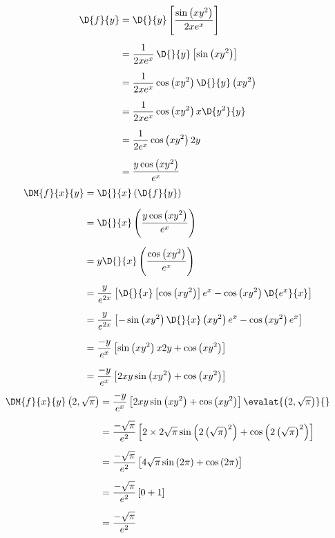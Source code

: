 \documentclass[a4paper,12pt,fleqn]{article}
\begin{document}
\begin{answer}
  \begin{align*}
    \D{f}{y}
    & = \D{}{y} \left[\frac{\sin\left(xy^2\right)}{2xe^x}\right]       \\[2mm]
    & = \frac{1}{2xe^x} \, \D{}{y} \left[\sin\left(xy^2\right)\right]  \\[2mm]
    & = \frac{1}{2xe^x} \cos\left(xy^2\right) \D{}{y}\left(xy^2\right) \\[2mm]
    & = \frac{1}{2xe^x} \cos\left(xy^2\right) x \D{y^2}{y}             \\[2mm]
    & = \frac{1}{2e^x} \cos\left(xy^2\right) 2y                        \\[2mm]
    & = \frac{y\cos\left(xy^2\right)}{e^x}
  \end{align*}
  \begin{align*}
    \DM{f}{x}{y}
    & = \D{}{x}\left(\D{f}{y}\right)                                  \\[2mm]
    & = \D{}{x}\left(\frac{y\cos\left(xy^2\right)}{e^x}\right)        \\[2mm]
    & = y \D{}{x}\left(\frac{\cos\left(xy^2\right)}{e^x}\right)       \\[2mm]
    & = \frac{y}{e^{2x}}\left[
    \D{}{x}\left[\cos\left(xy^2\right)\right]e^x  -
    \cos\left(xy^2\right)\D{e^x}{x}
    \right]                                                       \\[2mm]
    & = \frac{y}{e^{2x}}\left[
    -\sin\left(xy^2\right)\D{}{x}\left(xy^2\right)e^x  -
    \cos\left(xy^2\right)e^x
    \right]                                                       \\[2mm]
    & = \frac{-y}{e^{x}}\left[
    \sin\left(xy^2\right)x2y + \cos\left(xy^2\right)
    \right]                                                       \\[2mm]
    & = \frac{-y}{e^{x}}\left[
    2xy\sin\left(xy^2\right) + \cos\left(xy^2\right)
    \right]
  \end{align*}
  \begin{align*}
    \DM{f}{x}{y}\left(2, \sqrt{\pi}\right)
    & = \frac{-y}{e^{x}}\left[
        2xy\sin\left(xy^2\right) + \cos\left(xy^2\right)
    \right] \evalat{\left(2, \sqrt{\pi}\right)}{} \\[2mm]
    & = \frac{-\sqrt{\pi}}{e^2}\left[
          2\times 2\sqrt{\pi}\sin\left(2\left(\sqrt{\pi}\right)^2\right)
          + \cos\left(2\left(\sqrt{\pi}\right)^2\right)
        \right]  \\[2mm]
    & = \frac{-\sqrt{\pi}}{e^2}\left[
          4\sqrt{\pi}\sin\left(2\pi\right)
          + \cos\left(2\pi\right)
        \right]   \\[2mm]
    & = \frac{-\sqrt{\pi}}{e^2}\left[ 0 + 1 \right]    \\[2mm]
    & = \frac{-\sqrt{\pi}}{e^2}
  \end{align*}
\end{answer}
\end{document}
